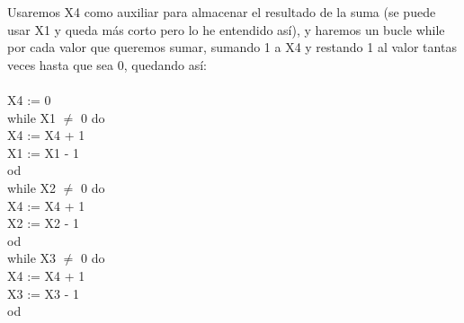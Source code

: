 \documentclass[11pt]{article}
\begin{document}
Usaremos X4 como auxiliar para almacenar el resultado de la suma (se puede usar X1 y queda más corto pero lo he entendido así), y haremos un bucle while por cada valor que queremos sumar, sumando 1 a X4 y restando 1 al valor tantas veces hasta que sea 0, quedando así:\\\\
X4 := 0\\
while X1 $\neq$ 0 do\\
	X4 := X4 + 1\\
	X1 := X1 - 1\\
od\\
while X2 $\neq$ 0 do\\
	X4 := X4 + 1\\
	X2 := X2 - 1\\
od\\
while X3 $\neq$ 0 do\\
	X4 := X4 + 1\\
	X3 := X3 - 1\\
od\\
\end{document}
